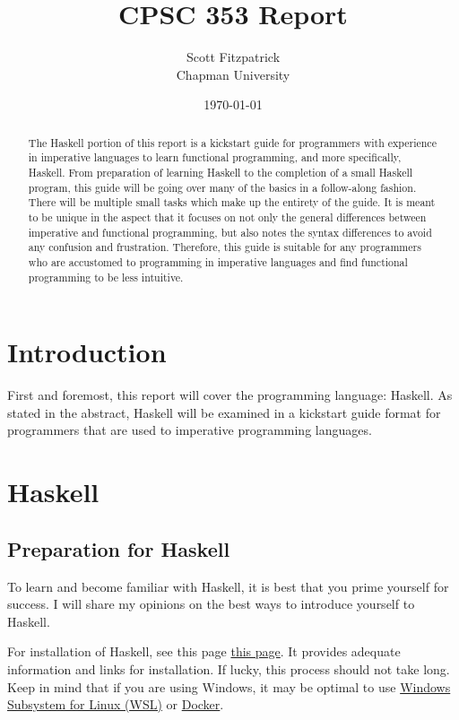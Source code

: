 \documentclass{article}
\title{CPSC 353 Report}
\author{Scott Fitzpatrick  \\ Chapman University}
\date{\today}
\begin{document}
\maketitle

\begin{abstract}
The Haskell portion of this report is a kickstart guide for programmers with experience in imperative languages to learn functional programming, and more specifically, Haskell. From preparation of learning Haskell to the completion of a small Haskell program, this guide will be going over many of the basics in a follow-along fashion. There will be multiple small tasks which make up the entirety of the guide. It is meant to be unique in the aspect that it focuses on not only the general differences between imperative and functional programming, but also notes the syntax differences to avoid any confusion and frustration. Therefore, this guide is suitable for any programmers who are accustomed to programming in imperative languages and find functional programming to be less intuitive.
\end{abstract}

\tableofcontents

\section{Introduction}\label{intro}

First and foremost, this report will cover the programming language: Haskell. As stated in the abstract, Haskell will be examined in a kickstart guide format for programmers that are used to imperative programming languages.

\section{Haskell}\label{haskell}

\subsection{Preparation for Haskell}
\medskip\noindent
To learn and become familiar with Haskell, it is best that you prime yourself for success. I will share my opinions on the best ways to introduce yourself to Haskell.

\medskip\noindent
For installation of Haskell, see this page \href{https://hackmd.io/@alexhkurz/Hk86XnCzD}{this page}. It provides adequate information and links for installation. If lucky, this process should not take long. Keep in mind that if you are using Windows, it may be optimal to use \href{https://docs.microsoft.com/en-us/windows/wsl/install}{Windows Subsystem for Linux (WSL)} or \href{https://www.docker.com/get-started}{Docker}.
\end{document}
